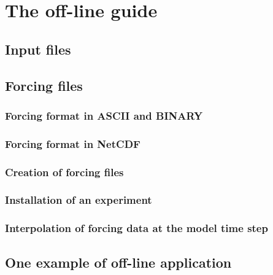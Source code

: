
\newpage
\section{The off-line guide}

\subsection{Input files}
\subsection{Forcing files}
\subsubsection{Forcing format in ASCII and BINARY}
\subsubsection{Forcing format in NetCDF}
\subsubsection{Creation of forcing files}
\subsubsection{Installation of an experiment}
\subsubsection{Interpolation of forcing data at the model time step}
\subsection{One example of off-line application}

